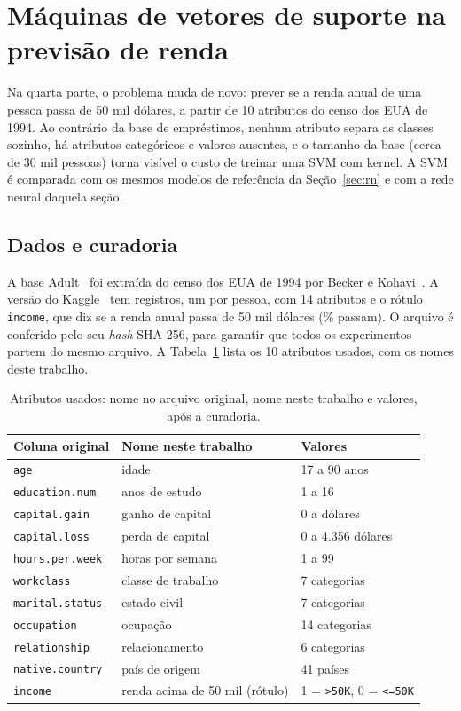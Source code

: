 \section{Máquinas de vetores de suporte na previsão de renda}\label{sec:svm}

Na quarta parte, o problema muda de novo: prever se a renda anual de uma pessoa passa de 50 mil dólares, a partir de 10 atributos do censo dos EUA de 1994. Ao contrário da base de empréstimos, nenhum atributo separa as classes sozinho, há atributos categóricos e valores ausentes, e o tamanho da base (cerca de 30 mil pessoas) torna visível o custo de treinar uma SVM com kernel. A SVM é comparada com os mesmos modelos de referência da Seção~\ref{sec:rn} e com a rede neural daquela seção.

\subsection{Dados e curadoria}\label{sec:sv_dados}

A base Adult~\cite{uci:adult} foi extraída do censo dos EUA de 1994 por Becker e Kohavi~\cite{kohavi:96}. A versão do Kaggle~\cite{kaggle:adult} tem \svLinhasBrutas{} registros, um por pessoa, com 14 atributos e o rótulo \texttt{income}, que diz se a renda anual passa de 50 mil dólares (\svPositivosBrutos\% passam). O arquivo é conferido pelo seu \emph{hash} SHA-256, para garantir que todos os experimentos partem do mesmo arquivo. A Tabela~\ref{tab:sv_atributos} lista os 10 atributos usados, com os nomes deste trabalho.

\begin{table}[ht]
\centering
\caption{Atributos usados: nome no arquivo original, nome neste trabalho e valores, após a curadoria.}
\label{tab:sv_atributos}
\footnotesize
\begin{tabular}{lll}
\toprule
Coluna original & Nome neste trabalho & Valores \\
\midrule
\texttt{age} & idade & 17 a 90 anos \\
\texttt{education.num} & anos de estudo & 1 a 16 \\
\texttt{capital.gain} & ganho de capital & 0 a \svGanhoMax{} dólares \\
\texttt{capital.loss} & perda de capital & 0 a 4.356 dólares \\
\texttt{hours.per.week} & horas por semana & 1 a 99 \\
\texttt{workclass} & classe de trabalho & 7 categorias \\
\texttt{marital.status} & estado civil & 7 categorias \\
\texttt{occupation} & ocupação & 14 categorias \\
\texttt{relationship} & relacionamento & 6 categorias \\
\texttt{native.country} & país de origem & 41 países \\
\texttt{income} & renda acima de 50 mil (rótulo) & 1 = \texttt{>50K}, 0 = \texttt{<=50K} \\
\bottomrule
\end{tabular}
\end{table}

